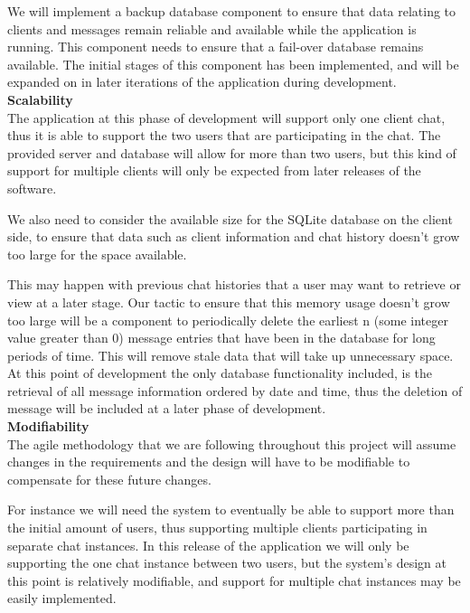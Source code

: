 \documentclass[29pt,a4paper]{moderncv}
\begin{document}
				We will implement a backup database component to ensure that data relating to clients and messages remain reliable and available while the application is running. This component needs to ensure that a fail-over database remains available. The initial stages of this component has been implemented, and will be expanded on in later iterations of the application during development.
				\\
			
			\noindent\textbf{Scalability}\\
				The application at this phase of development will support only one client chat, thus it is able to support the two users that are participating in the chat. The provided server and database will allow for more than two users, but this kind of support for multiple clients will only be expected from later releases of the software. 
				
				We also need to consider the available size for the SQLite database on the client side, to ensure that data such as client information and chat history doesn’t grow too large for the space available. 
				
				This may happen with previous chat histories that a user may want to retrieve or view at a later stage. Our tactic to ensure that this memory usage doesn’t grow too large will be a component to periodically delete the earliest n (some integer value greater than 0) message entries that have been in the database for long periods of time. This will remove stale data that will take up unnecessary space.  At this point of development the only database functionality included, is the retrieval of all message information ordered by date and time, thus the deletion of message will be included at a later phase of development.\\
			
			\noindent\textbf{Modifiability}\\
			The agile methodology that we are following throughout this project will assume changes in the requirements and the design will have to be modifiable to compensate for these future changes.
			
			For instance we will need the system to eventually be able to support more than the initial amount of users, thus supporting multiple clients participating in separate chat instances.  In this release of the application we will only be supporting the one chat instance between two users, but the system’s design at this point is relatively modifiable, and support for multiple chat instances may be easily implemented.
			
\end{document}
